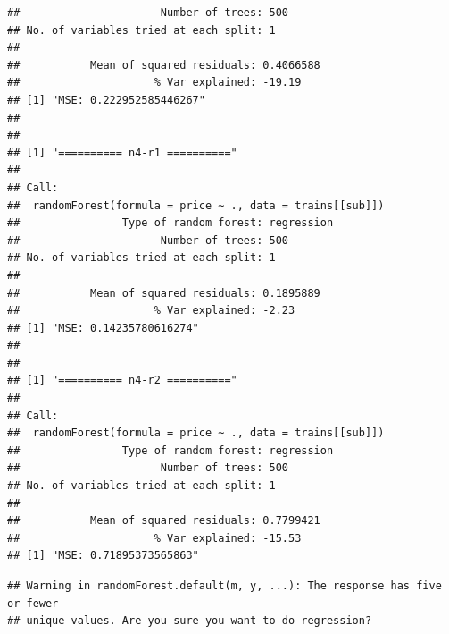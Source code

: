 \documentclass[
]{article}
\begin{document}
\begin{verbatim}
##                      Number of trees: 500
## No. of variables tried at each split: 1
## 
##           Mean of squared residuals: 0.4066588
##                     % Var explained: -19.19
## [1] "MSE: 0.222952585446267"
## 
## 
## [1] "========== n4-r1 =========="
## 
## Call:
##  randomForest(formula = price ~ ., data = trains[[sub]]) 
##                Type of random forest: regression
##                      Number of trees: 500
## No. of variables tried at each split: 1
## 
##           Mean of squared residuals: 0.1895889
##                     % Var explained: -2.23
## [1] "MSE: 0.14235780616274"
## 
## 
## [1] "========== n4-r2 =========="
## 
## Call:
##  randomForest(formula = price ~ ., data = trains[[sub]]) 
##                Type of random forest: regression
##                      Number of trees: 500
## No. of variables tried at each split: 1
## 
##           Mean of squared residuals: 0.7799421
##                     % Var explained: -15.53
## [1] "MSE: 0.71895373565863"
\end{verbatim}

\begin{verbatim}
## Warning in randomForest.default(m, y, ...): The response has five or fewer
## unique values. Are you sure you want to do regression?
\end{verbatim}
\end{document}
